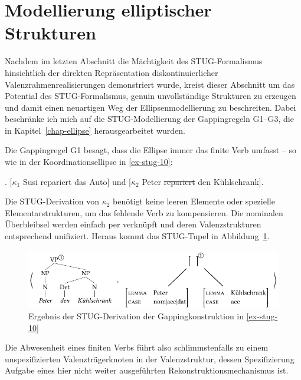 \section{Modellierung elliptischer Strukturen} \label{sec-stug-ellipse}

Nachdem im letzten Abschnitt die Mächtigkeit des STUG-Formalismus hinsichtlich der direkten Repräsentation diskontinuierlicher Valenzrahmenrealisierungen demonstriert wurde, kreist dieser Abschnitt um das Potential des STUG-Formalismus, genuin unvollständige Strukturen zu erzeugen und damit einen neuartigen Weg der Ellipsenmodellierung zu beschreiten. Dabei beschränke ich mich auf die STUG-Modellierung der Gappingregeln G1--G3, die in Kapitel~\ref{chap-ellipse} herausgearbeitet wurden. 


Die Gappingregel G1 besagt, dass die Ellipse immer das finite Verb umfasst -- so wie in der Koordinationsellipse in \ref{ex-stug-10}:

\ex. \label{ex-stug-10} [$\kappa_1$ Susi repariert das Auto] und [$\kappa_2$ Peter \sout{repariert} den Kühlschrank]. 

Die STUG-Derivation von $\kappa_2$ benötigt keine leeren Elemente oder spezielle Elementarstrukturen, um das fehlende Verb zu kompensieren. Die nominalen Überbleibsel werden einfach per  verknüpft und deren Valenzstrukturen entsprechend unifiziert. Heraus kommt das STUG-Tupel in Abbildung~\ref{fig-stug-14}. 
\begin{figure}[t]
\centering
\includegraphics{graphics/abb914.pdf}
\caption{\label{fig-stug-14} Ergebnis der STUG-Derivation der Gappingkonstruktion in \ref{ex-stug-10}}
\end{figure}
Die Abwesenheit eines finiten Verbs führt also schlimmstenfalls zu einem unspezifizierten Valenzträgerknoten in der Valenzstruktur, dessen Spezifizierung Aufgabe eines hier nicht weiter ausgeführten Rekonstruktionsmechanismus ist. 

